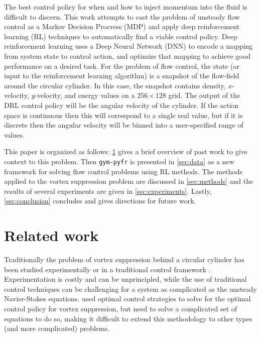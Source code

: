 \documentclass{article}
\begin{document}
The best control policy for when and how to inject momentum into the fluid is difficult to discern. This work attempts to cast the problem of unsteady flow control as a Markov Decision Procress (MDP) and apply deep reinforcement learning (RL) techniques to automatically find a viable control policy. Deep reinforcement learning uses a Deep Neural Network (DNN) to encode a mapping from system state to control action, and optimize that mapping to achieve good performance on a desired task. For the problem of flow control, the state (or input to the reinforcement learning algorithm) is a snapshot of the flow-field around the circular cylinder. In this case, the snapshot contains density, $x$-velocity, $y$-velocity, and energy values on a $256 \times 128$ grid. The output of the DRL control policy will be the angular velocity of the cylinder. If the action space is continuous then this will correspond to a single real value, but if it is discrete then the angular velocity will be binned into a user-specified range of values.

This paper is organized as follows: \cref{sec:related} gives a brief overview of past work to give context to this problem. Then \verb|gym-pyfr| is presented in \cref{sec:data} as a new framework for solving flow control problems using RL methods. The methods applied to the vortex suppression problem are discussed in \cref{sec:methods} and the results of several experiments are given in \cref{sec:experiments}. Lastly, \cref{sec:conclusion} concludes and gives directions for future work.


\section{Related work}
\label{sec:related}
Traditionally the problem of vortex suppression behind a circular cylinder has been studied experimentally \cite{bearman2004experimental} or in a traditional control framework \cite{homescu2002suppression}. Experimentation is costly and can be unprincipled, while the use of traditional control techniques can be challenging for a system as complicated as the unsteady Navier-Stokes equations. \cite{homescu2002suppression} used optimal control strategies to solve for the optimal control policy for vortex suppression, but need to solve a complicated set of equations to do so, making it difficult to extend this methodology to other types (and more complicated) problems.
\end{document}
